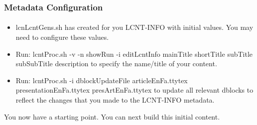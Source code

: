 \begin{comment}
*****  [[elisp:(org-cycle)][| ]]  [[elisp:(blee:ppmm:org-mode-toggle)][Nat]] [[elisp:(beginning-of-buffer)][Top]] [[elisp:(delete-other-windows)][(1)]] || /Frame/ *Label=MetadataConfiguration*  Metadata Configuration ::  [[elisp:(org-cycle)][| ]]
\end{comment}

\begin{frame}[fragile,label=MetadataConfiguration]
    \frametitle{Metadata Configuration}
    \framesubtitle{}

\begin{itemize}
\item lcnLcntGens.sh has created for you LCNT-INFO with initial values. You may need to configure these values.
  
\item Run: lcntProc.sh -v -n showRun -i editLcntInfo mainTitle shortTitle subTitle subSubTitle description
  to specify the name/title of your content.
\item Run: lcntProc.sh -i dblockUpdateFile articleEnFa.ttytex presentationEnFa.ttytex presArtEnFa.ttytex
  to update all relevant dblocks to reflect the changes that you made to the LCNT-INFO metadata.
\end{itemize}

You now have a starting point. You can next build this initial content.

\end{frame}


\begin{comment}
*  [[elisp:(org-cycle)][| ]] [[elisp:(org-show-subtree)][|=]] [[elisp:(show-children 10)][|V]] [[elisp:(bx:orgm:indirectBufOther)][|>]] [[elisp:(bx:orgm:indirectBufMain)][|I]] [[elisp:(blee:ppmm:org-mode-toggle)][|N]] [[elisp:(org-top-overview)][|O]] [[elisp:(progn (org-shifttab) (org-content))][|C]] [[elisp:(delete-other-windows)][|1]]  /Section/   Build Verification ::  [[elisp:(org-cycle)][| ]]
\end{comment}

